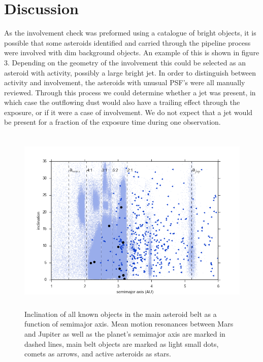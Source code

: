 \documentclass[iop,apj]{emulateapj}
\begin{document}
\section{Discussion}

As the involvement check was preformed using a catalogue of bright objects, it is possible that some asteroids identified and carried through the pipeline process were involved with dim background objects. An example of this is shown in figure 3. Depending on the geometry of the involvement this could be selected as an asteroid with activity, possibly a large bright jet. In order to distinguish between activity and involvement, the asteroids with unusual PSF's were all manually reviewed. Through this process we could determine whether a jet was present, in which case the outflowing dust would also have a trailing effect through the exposure, or if it were a case of involvement. We do not expect that a jet would be present for a fraction of the exposure time during one observation. 






\begin{figure}[!htb]
    \centering
    \includegraphics[height=9cm]{graphs/aa_comets_mba_all.png}
    \caption{Inclination of all known objects in the main asteroid belt as a function of semimajor axis.  Mean motion resonances between Mars and Jupiter as well as the planet's semimajor axis are marked in dashed lines, main belt objects are marked as light small dots, comets as arrows, and active asteroids as stars. \cite{mpc}}\label{fig:1}
\end{figure}
\end{document}
